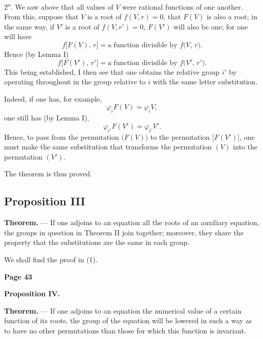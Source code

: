 \documentclass{article}
\begin{document}
2\textsuperscript{o}. We saw above that all values of $V$ were rational functions of one another. From this, suppose that $V$ is a root of $f(V,r)=0$, that $F(V)$ is also a root; in the same way, if $V'$ is a root of $f(V,r')=0$, $F(V')$ will also be one; for one will have
\[
f\bigl[F(V),\,r\bigr] = \text{a function divisible by } f\bigl(V,\,r\bigr).
\]
Hence (by Lemma I)
\[
f\bigl[F(V'),\,r'\bigr] = \text{a function divisible by } f\bigl(V',\,r'\bigr).
\]
This being established, I then see that one obtains the relative group $i'$ by operating throughout in the group relative to $i$ with the same letter substitution.

Indeed, if one has, for example,
\[
\varphi_{i} F(V) = \varphi_{i} V,
\]
one still has (by Lemma I),
\[
\varphi_{i'} F(V') = \varphi_{i'} V'.
\]
Hence, to pass from the permutation $\bigl(F(V)\bigr)$ to the permutation $\bigl[F(V')\bigr]$, one must make the same substitution that transforms the permutation $(V)$ into the permutation $(V')$.

The theorem is thus proved.

\subsection*{Proposition III}

\textbf{Theorem.} --- If one adjoins to an equation all the roots of an auxiliary equation, the groups in question in Theorem II join together; moreover, they share the property that the substitutions are the same in each group.

We shall find the proof in (1).



\newpage

\centerline{\textbf{Page 43}}

\medskip

\textbf{Proposition IV.}

\textbf{Theorem.} --- If one adjoins to an equation the numerical value of a certain function of its roots, the group of the equation will be lowered in such a way as to have no other permutations than those for which this function is invariant.
\end{document}
